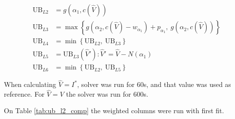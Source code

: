 \documentclass{article}
\begin{document}
\begin{align*}
\mathrm{UB}_{L2} &= g(\alpha_1, c(\hat{V})) \\
\mathrm{UB}_{L3} &= \max\left\{g(\alpha_2, c(\hat{V}) - w_{\alpha_1}) + p_{\alpha_1},\ g(\alpha_2, c(\hat{V}))\right\} \\
\mathrm{UB}_{L4} &= \min\left\{\mathrm{UB}_{L2},\ \mathrm{UB}_{L3}\right\} \\
\mathrm{UB}_{L5} &= \mathrm{UB}_{L3}(\hat{V}') : \hat{V}' = \hat{V} - N(\alpha_1) \\
\mathrm{UB}_{L6} &= \min\left\{\mathrm{UB}_{L2},\ \mathrm{UB}_{L5}\right\}
\end{align*}

When calculating $\hat{V} = I^*$, solver was run for 60s, and that value was
used as reference. For $\hat{V} = V$ the solver was run for 600s.

On Table \ref{tab:ub_l2_comp} the weighted columns were run with first fit.
















\end{document}
